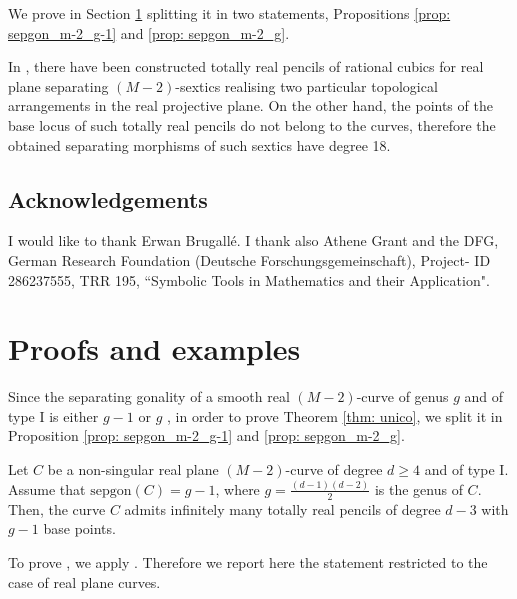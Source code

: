 We prove  in Section \ref{sec: proofs} splitting it in two statements, Propositions \ref{prop: sepgon_m-2_g-1} and \ref{prop: sepgon_m-2_g}. 
	
 \begin{rem}
 	\label{rem: tot_real_pencil_no_base_points}
 	In \cite{Touz13}, there have been constructed totally real pencils of rational cubics for real plane separating $(M-2)$-sextics realising two particular topological arrangements in the real projective plane. On the other hand, the points of the base locus of such totally real pencils do not belong to the curves, therefore the obtained separating morphisms of such sextics have degree 18.
 
 	\end{rem}


\subsection*{Acknowledgements}
I would like to thank Erwan Brugall\'e. I thank also Athene Grant and the DFG, German Research Foundation (Deutsche Forschungsgemeinschaft), Project- ID 286237555, TRR 195, ``Symbolic Tools in Mathematics and their Application".	
	\section{Proofs and examples}
	\label{sec: proofs}
	Since the separating gonality of a smooth real $(M-2)$-curve of genus $g$ and of type I is either $g-1$ or $g$ \cite[Theorem 7.1]{Gaba06}, in order to prove Theorem \ref{thm: unico}, we split it in Proposition \ref{prop: sepgon_m-2_g-1} and \ref{prop: sepgon_m-2_g}.
	\begin{prop}
	\label{prop: sepgon_m-2_g-1}
	Let $C$ be a non-singular real plane $(M-2)$-curve of degree $d \geq 4$ and of type I. Assume that $\text{sepgon}(C)=g-1$, where $g=\frac{(d-1)(d-2)}{2}$ is the genus of $C$. Then, the curve $C$ admits infinitely many totally real pencils of degree $d-3$ with $g-1$ base points.
\end{prop}
To prove , we apply \cite[Theorem 3.2]{Orev21}. Therefore we report here the statement restricted to the case of real plane curves.


